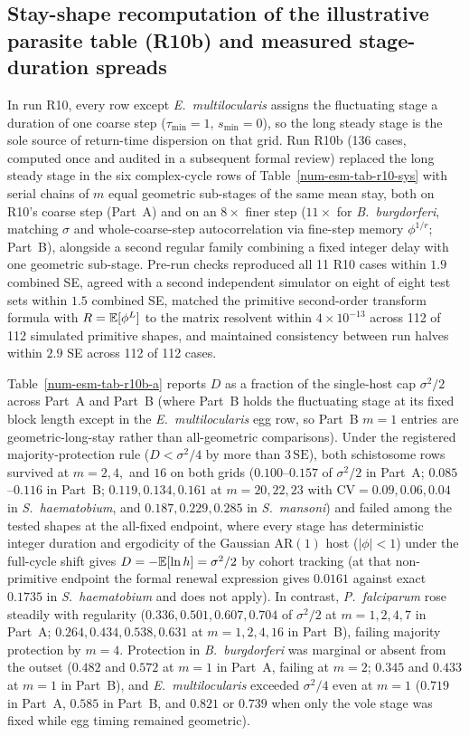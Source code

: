 \subsection{Stay-shape recomputation of the illustrative parasite table (R10b) and measured stage-duration spreads}\label{num-esm-r10b}

In run R10, every row except \emph{E.~multilocularis} assigns the fluctuating stage a duration of one coarse step ($\tau_{\min} = 1$, $s_{\min} = 0$), so the long steady stage is the sole source of return-time dispersion on that grid. Run R10b (136 cases, computed once and audited in a subsequent formal review) replaced the long steady stage in the six complex-cycle rows of Table~\ref{num-esm-tab-r10-sys} with serial chains of $m$ equal geometric sub-stages of the same mean stay, both on R10's coarse step (Part~A) and on an $8\times$ finer step ($11\times$ for \emph{B.~burgdorferi}, matching $\sigma$ and whole-coarse-step autocorrelation via fine-step memory $\phi^{1/r}$; Part~B), alongside a second regular family combining a fixed integer delay with one geometric sub-stage. Pre-run checks reproduced all 11 R10 cases within $1.9$ combined SE, agreed with a second independent simulator on eight of eight test sets within $1.5$ combined SE, matched the primitive second-order transform formula with $R = \mathbb{E}[\phi^L]$ to the matrix resolvent within $4 \times 10^{-13}$ across 112 of 112 simulated primitive shapes, and maintained consistency between run halves within $2.9$ SE across 112 of 112 cases.

Table~\ref{num-esm-tab-r10b-a} reports $D$ as a fraction of the single-host cap $\sigma^2/2$ across Part~A and Part~B (where Part~B holds the fluctuating stage at its fixed block length except in the \emph{E.~multilocularis} egg row, so Part~B $m = 1$ entries are geometric-long-stay rather than all-geometric comparisons). Under the registered majority-protection rule ($D < \sigma^2/4$ by more than $3\,\mathrm{SE}$), both schistosome rows survived at $m = 2, 4,$ and $16$ on both grids ($0.100$--$0.157$ of $\sigma^2/2$ in Part~A; $0.085$--$0.116$ in Part~B; $0.119, 0.134, 0.161$ at $m = 20, 22, 23$ with $\mathrm{CV} = 0.09, 0.06, 0.04$ in \emph{S.~haematobium}, and $0.187, 0.229, 0.285$ in \emph{S.~mansoni}) and failed among the tested shapes at the all-fixed endpoint, where every stage has deterministic integer duration and ergodicity of the Gaussian $\mathrm{AR}(1)$ host ($|\phi| < 1$) under the full-cycle shift gives $D = -\mathbb{E}[\ln h] = \sigma^2/2$ by cohort tracking (at that non-primitive endpoint the formal renewal expression gives $0.0161$ against exact $0.1735$ in \emph{S.~haematobium} and does not apply). In contrast, \emph{P.~falciparum} rose steadily with regularity ($0.336, 0.501, 0.607, 0.704$ of $\sigma^2/2$ at $m = 1, 2, 4, 7$ in Part~A; $0.264, 0.434, 0.538, 0.631$ at $m = 1, 2, 4, 16$ in Part~B), failing majority protection by $m = 4$. Protection in \emph{B.~burgdorferi} was marginal or absent from the outset ($0.482$ and $0.572$ at $m = 1$ in Part~A, failing at $m = 2$; $0.345$ and $0.433$ at $m = 1$ in Part~B), and \emph{E.~multilocularis} exceeded $\sigma^2/4$ even at $m = 1$ ($0.719$ in Part~A, $0.585$ in Part~B, and $0.821$ or $0.739$ when only the vole stage was fixed while egg timing remained geometric).

